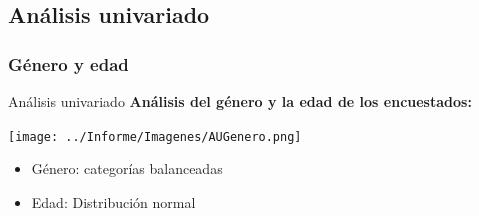 \documentclass[pdf]{beamer}
\begin{document}
{%
\subsection{Análisis univariado}
    \subsubsection{Género y edad}
\begin{frame}{Análisis univariado}
    \textbf{Análisis del género y la edad de los encuestados:}  
    \begin{center}
        \texttt{[image: ../Informe/Imagenes/AUGenero.png]}
    \end{center}
    \begin{itemize}
        \item Género: categorías balanceadas
        \item Edad: Distribución normal
    \end{itemize}
\end{frame}
              
    
           
           
}
\end{document}
